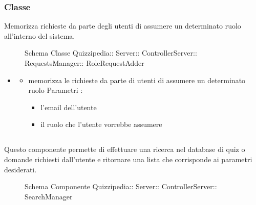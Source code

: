 \subsubsection{Classe }
Memorizza richieste da parte degli utenti di assumere un determinato ruolo all'interno del sistema.
\begin{figure}[H]
\centering
\noindent{}
\caption[Schema Classe RoleRequestAdder]{Schema Classe Quizzipedia:: Server:: ControllerServer:: RequestsManager:: RoleRequestAdder}
\end{figure}
\begin{itemize}
\item {}
\begin{itemize}
\item {}
\newline
memorizza le richieste da parte di utenti di assumere un determinato ruolo
\newline
Parametri :
\begin{itemize}
\item {}
\newline
l'email dell'utente
\item {}
\newline
il ruolo che l'utente vorrebbe assumere
\end{itemize}
\end{itemize}
\end{itemize}
\subsection{}
Questo componente permette di effettuare una ricerca nel database di quiz o domande richiesti dall'utente e ritornare una lista che corrisponde ai parametri desiderati.
\begin{figure}[H]
\centering
\noindent{}
\caption[Schema Componente SearchManager]{Schema Componente Quizzipedia:: Server:: ControllerServer:: SearchManager}
\end{figure}
